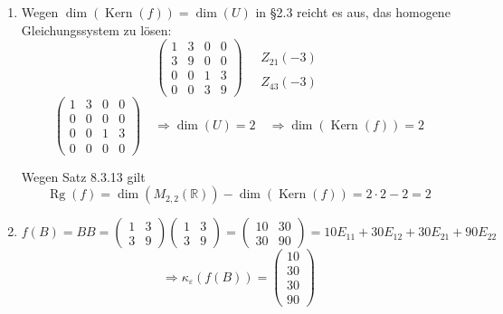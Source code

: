 \documentclass[a4paper,12pt]{article}
\begin{document}
\begin{enumerate}[label=\alph*)]
\[        = 3 \cdot E_{21} + 9 \cdot E_{22}
    \]
    \[
        \Rightarrow {}_\varepsilon M_\varepsilon(f) = \begin{pmatrix}1&3&0&0\\3&9&0&0\\0&0&1&3\\0&0&3&9\end{pmatrix}
    \]

    \item
    Wegen $\dim(\operatorname{Kern}(f)) = \dim(U)$ in §2.3 reicht es aus, das homogene Gleichungssystem zu lösen:
    \[
        \begin{pmatrix}1&3&0&0\\3&9&0&0\\0&0&1&3\\0&0&3&9\end{pmatrix}
        \quad
        \begin{array}{l} \\ Z_{21}(-3) \\ \\ Z_{43}(-3) \end{array}
    \]
    \[
        \begin{pmatrix}1&3&0&0\\0&0&0&0\\0&0&1&3\\0&0&0&0\end{pmatrix}
        \quad \Rightarrow \dim(U) = 2 \quad \Rightarrow \dim(\operatorname{Kern}(f)) = 2
    \]

    Wegen Satz 8.3.13 gilt
    \[
        \operatorname{Rg}(f) = \dim(M_{2,2}(\mathbb{R})) - \dim(\operatorname{Kern}(f)) = 2 \cdot 2 - 2 = 2
    \]

    \item
    \[
        f(B) = BB = \begin{pmatrix}1&3\\3&9\end{pmatrix}\begin{pmatrix}1&3\\3&9\end{pmatrix}
        = \begin{pmatrix}10&30\\30&90\end{pmatrix}
        = 10 E_{11} + 30 E_{12} + 30 E_{21} + 90 E_{22}
    \]
    \[
        \Rightarrow \kappa_\varepsilon(f(B)) = \begin{pmatrix}10\\30\\30\\90\end{pmatrix}
    \]

\end{enumerate}
\end{document}
